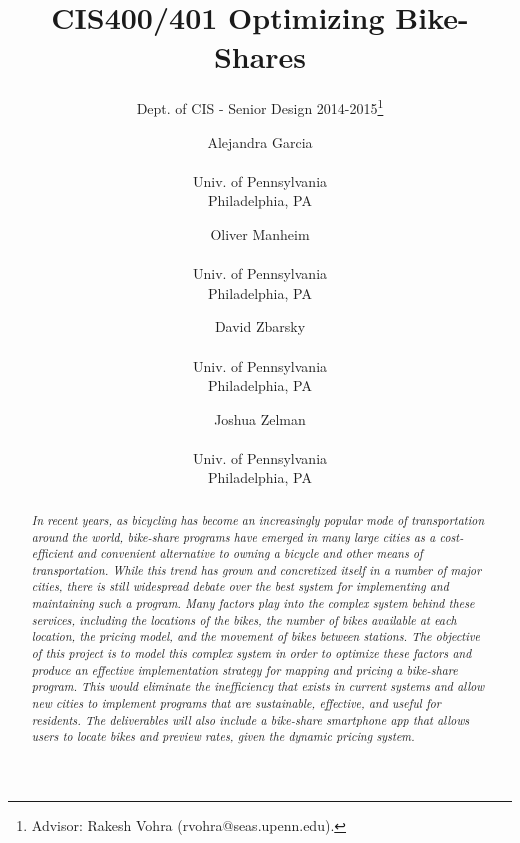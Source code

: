 \documentclass{sig-alternate}
\begin{document}
 

\title{CIS400/401 Optimizing Bike-Shares}
\subtitle{Dept. of CIS - Senior Design 2014-2015\thanks{Advisor: Rakesh Vohra (rvohra@seas.upenn.edu).}}
\author{
\alignauthor Alejandra Garcia \\  \\ Univ. of Pennsylvania \\ Philadelphia, PA \and \alignauthor Oliver Manheim \\  \\ Univ. of Pennsylvania \\ Philadelphia, PA \and \alignauthor David Zbarsky \\  \\ Univ. of Pennsylvania \\ Philadelphia, PA \and \alignauthor Joshua Zelman \\  \\ Univ. of Pennsylvania \\ Philadelphia, PA}
\date{}
\maketitle

\begin{abstract}
  \textit{In recent years, as bicycling has become an increasingly popular mode of transportation around the world, bike-share programs have emerged in many large cities as a cost-efficient and convenient alternative to owning a bicycle and other means of transportation. While this trend has grown and concretized itself in a number of major cities, there is still widespread debate over the best system for implementing and maintaining such a program. Many factors play into the complex system behind these services, including the locations of the bikes, the number of bikes available at each location, the pricing model, and the movement of bikes between stations. The objective of this project is to model this complex system in order to optimize these factors and produce an effective implementation strategy for mapping and pricing a bike-share program. This would eliminate the inefficiency that exists in current systems and allow new cities to implement programs that are sustainable, effective, and useful for residents. The deliverables will also include a bike-share smartphone app that allows users to locate bikes and preview rates, given the dynamic pricing system.}
\end{abstract}
\end{document}
